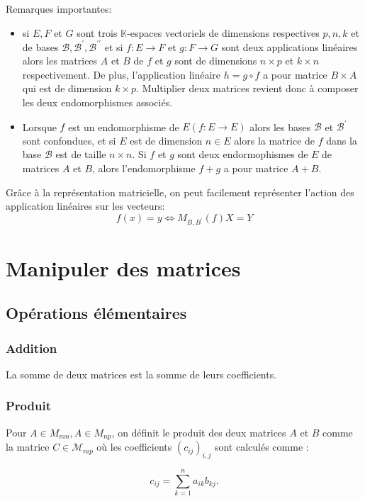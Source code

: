 Remarques importantes:
\begin{itemize}
    \item si $E, F$ et $G$ sont trois $\mathbb{K}$-espaces vectoriels de dimensions respectives $p, n, k$ et de bases $\mathcal{B}, \mathcal{B}^{\prime}, \mathcal{B}^{\prime \prime}$ et si $f: E \rightarrow F$ et $g: F \rightarrow G$ sont deux applications linéaires alors les matrices $A$ et $B$ de $f$ et $g$ sont de dimensions $n \times p$ et $k \times n$ respectivement.
    De plus, l'application linéaire $h=g \circ f$ a pour matrice $B \times A$ qui est de dimension $k \times p$. Multiplier deux matrices revient donc à composer les deux endomorphismes associés.
    \item Lorsque $f$ est un endomorphisme de $E(f: E \rightarrow E)$ alors les bases $\mathcal{B}$ et $\mathcal{B}^{\prime}$ sont confondues, et si $E$ est de dimension $n \in E$ alors la matrice de $f$ dans la base $\mathcal{B}$ est de taille $n \times n$. Si $f$ et $g$ sont deux endormophismes de $E$ de matrices $A$ et $B$, alors l'endomorphisme $f+g$ a pour matrice $A+B$.
\end{itemize}

Grâce à la représentation matricielle, on peut facilement représenter l'action des application linéaires sur les vecteurs:
$$
f(x) = y \Longleftrightarrow M_{B, B^{\prime}}(f) X = Y
$$
\section{Manipuler des matrices}
\subsection{Opérations élémentaires}
\subsubsection*{Addition}
La somme de deux matrices est la somme de leurs coefficients.

\subsubsection*{Produit}

Pour $A \in M_{m n}, A \in M_{n p}$, on définit le produit des deux matrices $A$ et $B$ comme la matrice $C \in \mathcal{M}_{m p}$ où les coefficients $\left(c_{i j}\right)_{i, j}$ sont calculés comme :

$$
c_{i j}=\sum_{k=1}^n a_{i k} b_{k j} .
$$


